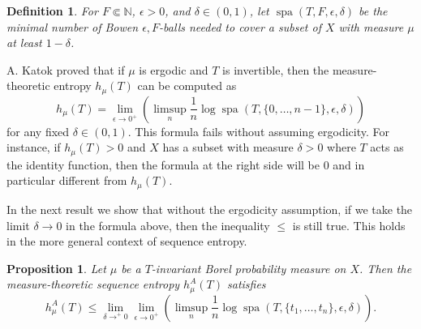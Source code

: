 \documentclass[a4paper,oneside]{amsart}
\renewcommand{\(}{\begin{dmath*}}
\renewcommand{\)}{\end{dmath*}}
\newtheorem{proposition}[theorem]{Proposition}
\newtheorem{definition}[theorem]{Definition}
\theoremstyle{definition}
\newcommand{\N}{\mathbb{N}}
\newcommand{\spa}{\operatorname{spa}}
\begin{document}
\begin{definition}
    For $F\Subset\N$, $\epsilon>0$, and $\delta\in (0,1)$, let $\spa(T,F,\epsilon,\delta)$ be the minimal number of Bowen $\epsilon,F$-balls needed to cover a subset of $X$ with measure $\mu$ at least $1-\delta$.
\end{definition}
A. Katok proved \cite[Theorem 1.1]{katok_lyapunov_1980} that if $\mu$ is ergodic and $T$ is invertible, then the measure-theoretic entropy $h_{\mu}(T)$ can be computed as 
\[h_\mu(T)=\lim_{\epsilon\to 0^+} \left(\limsup_n \frac{1}{n}\log \spa(T,\{0,\dots,n-1\},\epsilon,\delta)\right)\]
for any fixed  $\delta\in(0,1)$. This formula fails without assuming ergodicity. For instance, if $h_{\mu}(T)>0$  and $X$ has a subset with measure $\delta>0$ where $T$ acts as the identity function, then the formula at the right side will be $0$ and in particular different from $h_\mu(T)$.

In the next result we show that without the ergodicity assumption, if we take the limit $\delta\to 0$ in the formula above, then the inequality $\leq$ is still true. This holds in the more general context of sequence entropy. 
\begin{proposition}\label{katok-v2}
Let $\mu$ be a $T$-invariant Borel probability measure on $X$.  
Then the measure-theoretic sequence entropy $h^A_{\mu}(T)$ satisfies
    \[h^{A}_{\mu}(T)\leq \lim_{\delta\to^+0}\lim_{\epsilon\to 0^+}\left(\limsup_n \frac{1}{n}\log \spa(T,\{t_1,\dots,t_n\},\epsilon,\delta)\right).\]
\end{proposition}
\end{document}
